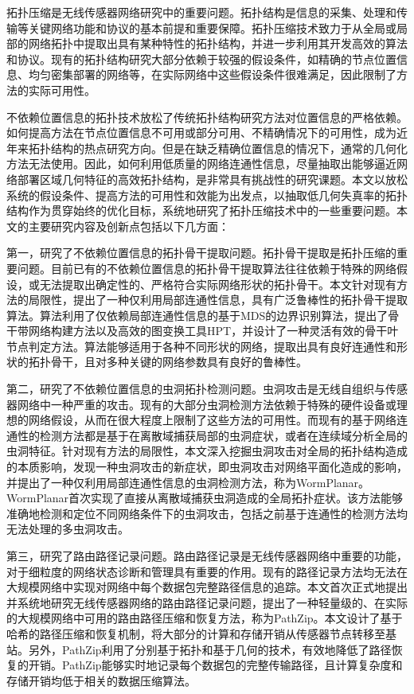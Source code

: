 \begin{cabstract}
拓扑压缩是无线传感器网络研究中的重要问题。拓扑结构是信息的采集、处理和传输等关键网络功能和协议的基本前提和重要保障。拓扑压缩技术致力于从全局或局部的网络拓扑中提取出具有某种特性的拓扑结构，并进一步利用其开发高效的算法和协议。现有的拓扑结构研究大部分依赖于较强的假设条件，如精确的节点位置信息、均匀密集部署的网络等，在实际网络中这些假设条件很难满足，因此限制了方法的实际可用性。

不依赖位置信息的拓扑技术放松了传统拓扑结构研究方法对位置信息的严格依赖。如何提高方法在节点位置信息不可用或部分可用、不精确情况下的可用性，成为近年来拓扑结构的热点研究方向。但是在缺乏精确位置信息的情况下，通常的几何化方法无法使用。因此，如何利用低质量的网络连通性信息，尽量抽取出能够逼近网络部署区域几何特征的高效拓扑结构，是非常具有挑战性的研究课题。本文以放松系统的假设条件、提高方法的可用性和效能为出发点，以抽取低几何失真率的拓扑结构作为贯穿始终的优化目标，系统地研究了拓扑压缩技术中的一些重要问题。本文的主要研究内容及创新点包括以下几方面：

第一，研究了不依赖位置信息的拓扑骨干提取问题。拓扑骨干提取是拓扑压缩的重要问题。目前已有的不依赖位置信息的拓扑骨干提取算法往往依赖于特殊的网络假设，或无法提取出确定性的、严格符合实际网络形状的拓扑骨干。本文针对现有方法的局限性，提出了一种仅利用局部连通性信息，具有广泛鲁棒性的拓扑骨干提取算法。算法利用了仅依赖局部连通性信息的基于MDS的边界识别算法，提出了骨干带网络构建方法以及高效的图变换工具HPT，并设计了一种灵活有效的骨干叶节点判定方法。算法能够适用于各种不同形状的网络，提取出具有良好连通性和形状的拓扑骨干，且对多种关键的网络参数具有良好的鲁棒性。

第二，研究了不依赖位置信息的虫洞拓扑检测问题。虫洞攻击是无线自组织与传感器网络中一种严重的攻击。现有的大部分虫洞检测方法依赖于特殊的硬件设备或理想的网络假设，从而在很大程度上限制了这些方法的可用性。而现有的基于网络连通性的检测方法都是基于在离散域捕获局部的虫洞症状，或者在连续域分析全局的虫洞特征。针对现有方法的局限性，本文深入挖掘虫洞攻击对全局的拓扑结构造成的本质影响，发现一种虫洞攻击的新症状，即虫洞攻击对网络平面化造成的影响，并提出了一种仅利用局部连通性信息的虫洞检测方法，称为WormPlanar。WormPlanar首次实现了直接从离散域捕获虫洞造成的全局拓扑症状。该方法能够准确地检测和定位不同网络条件下的虫洞攻击，包括之前基于连通性的检测方法均无法处理的多虫洞攻击。

第三，研究了路由路径记录问题。路由路径记录是无线传感器网络中重要的功能，对于细粒度的网络状态诊断和管理具有重要的作用。现有的路径记录方法均无法在大规模网络中实现对网络中每个数据包完整路径信息的追踪。本文首次正式地提出并系统地研究无线传感器网络的路由路径记录问题，提出了一种轻量级的、在实际的大规模网络中可用的路由路径压缩和恢复方法，称为PathZip。本文设计了基于哈希的路径压缩和恢复机制，将大部分的计算和存储开销从传感器节点转移至基站。另外，PathZip利用了分别基于拓扑和基于几何的技术，有效地降低了路径恢复的开销。PathZip能够实时地记录每个数据包的完整传输路径，且计算复杂度和存储开销均低于相关的数据压缩算法。


\end{cabstract}
